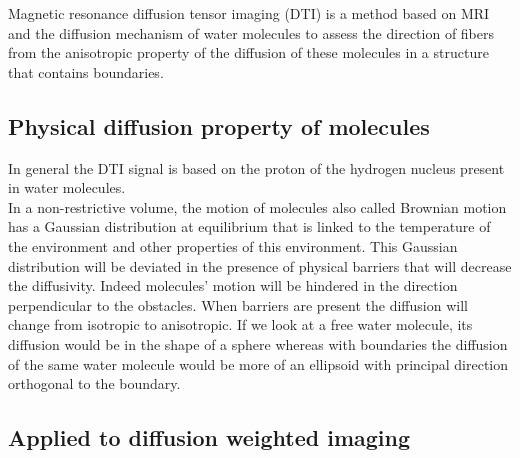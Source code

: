 Magnetic resonance diffusion tensor imaging (DTI) is a method based on MRI and the diffusion mechanism of water molecules to assess the direction of fibers from the anisotropic property of the diffusion of these molecules in a structure that contains boundaries.\\

\subsection{Physical diffusion property of molecules}

In general the DTI signal is based on the proton of the hydrogen nucleus present in water molecules.\\
In a non-restrictive volume, the motion of molecules also called Brownian motion has a Gaussian distribution at equilibrium that is linked to the temperature of the environment and other properties of this environment. This Gaussian distribution will be deviated in the presence of physical barriers that will decrease the diffusivity. Indeed molecules' motion will be hindered in the direction perpendicular to the obstacles. When barriers are present the diffusion will change from isotropic to anisotropic. If we look at a free water molecule, its diffusion would be in the shape of a sphere whereas with boundaries the diffusion of the same water molecule would be more of an ellipsoid with principal direction orthogonal to the boundary.

\subsection{Applied to diffusion weighted imaging}

